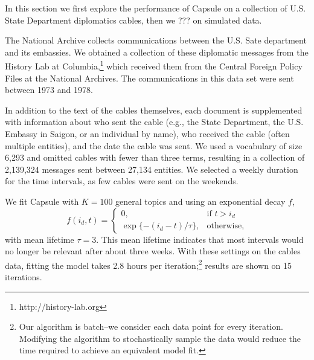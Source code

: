 




\PP In this section we first explore the performance of Capsule on a collection of U.S. State Department diplomatics cables, then we ??? on simulated data.

The National Archive collects communications between the U.S. Sate department and its embassies.  We obtained a collection of these diplomatic messages from the History Lab at Columbia,\footnote{http://history-lab.org} which received them from the Central Foreign Policy Files at the National Archives.  The communications in this data set were sent between 1973 and 1978.

In addition to the text of the cables themselves, each document is supplemented with information about who sent the cable (e.g., the State Department, the U.S. Embassy in Saigon, or an individual by name), who received the cable (often multiple entities), and the date the cable was sent.  We used a vocabulary of size 6,293 and omitted cables with fewer than three terms, resulting in a collection of 2,139,324 messages sent between 27,134 entities.  We selected a weekly duration for the time intervals, as few cables were sent on the weekends.

We fit Capsule with $K=100$ general topics and using an exponential decay $f$,
\begin{equation}
f(i_d, t) = 
\begin{cases}
    0,			& \text{if } t > i_d\\
    \exp\{-(i_d - t) / \tau\},          & \text{otherwise,}
\end{cases}
\end{equation}
with mean lifetime $\tau=3$.  This mean lifetime indicates that most intervals would no longer be relevant after about three weeks.  With these settings on the cables data, fitting the model takes 2.8 hours per iteration;\footnote{Our algorithm is batch--we consider each data point for every iteration.  Modifying the algorithm to stochastically sample the data would reduce the time required to achieve an equivalent model fit.} results are shown on 15 iterations.

